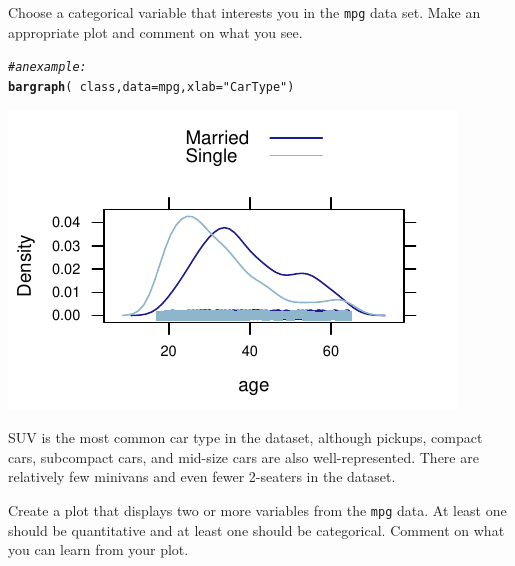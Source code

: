 \documentclass[twoside]{book}\usepackage[]{graphicx}\usepackage[]{xcolor}
\makeatletter
\def\maxwidth{ %
  \ifdim\Gin@nat@width>\linewidth
    \linewidth
  \else
    \Gin@nat@width
  \fi
}
\newcommand{\hlstr}[1]{\textcolor[rgb]{0.192,0.494,0.8}{#1}}%
\newcommand{\hlcom}[1]{\textcolor[rgb]{0.678,0.584,0.686}{\textit{#1}}}%
\newcommand{\hlopt}[1]{\textcolor[rgb]{0,0,0}{#1}}%
\newcommand{\hlstd}[1]{\textcolor[rgb]{0.345,0.345,0.345}{#1}}%
\newcommand{\hlkwc}[1]{\textcolor[rgb]{0.333,0.667,0.333}{#1}}%
\newcommand{\hlkwd}[1]{\textcolor[rgb]{0.737,0.353,0.396}{\textbf{#1}}}%
\newenvironment{kframe}{%
 \def\at@end@of@kframe{}%
 \ifinner\ifhmode%
  \def\at@end@of@kframe{\end{minipage}}%
  \begin{minipage}{\columnwidth}%
 \fi\fi%
 \def\FrameCommand##1{\hskip\@totalleftmargin \hskip-\fboxsep
 \colorbox{shadecolor}{##1}\hskip-\fboxsep
     \hskip-\linewidth \hskip-\@totalleftmargin \hskip\columnwidth}%
 \MakeFramed {\advance\hsize-\width
   \@totalleftmargin\z@ \linewidth\hsize
   \@setminipage}}%
 {\par\unskip\endMakeFramed%
 \at@end@of@kframe}
\newenvironment{knitrout}{}{} %
\newcommand{\Rindex}[1]{\index{\texttt{#1}}}
\newcommand{\dataframe}[1]{{\color{blue!80!black}\texttt{#1}}\Rindex{#1}}
\newcounter{example}[section]
\makeatother
\begin{document}
\begin{problem}
	Choose a categorical variable that interests you in the \dataframe{mpg}
	data set.  Make an appropriate plot and comment on what you see.
\end{problem}
\begin{solution}
\begin{knitrout}
\color{fgcolor}\begin{kframe}
\begin{alltt}
\hlcom{# an example:}
\hlkwd{bargraph}\hlstd{(}\hlopt{~}\hlstd{class,} \hlkwc{data} \hlstd{= mpg,} \hlkwc{xlab} \hlstd{=} \hlstr{"Car Type"}\hlstd{)}
\end{alltt}
\end{kframe}

{\centering \includegraphics[width=\maxwidth]{figures/fig-unnamed-chunk-24-1} 

}



\end{knitrout}
SUV is the most common car type in the dataset, although pickups, compact cars, subcompact cars, and mid-size cars are also well-represented.  There are relatively few minivans and even fewer 2-seaters in the dataset.
\end{solution}

\begin{problem}
	Create a plot that displays two or more variables from the 
	\dataframe{mpg} data.  At least one should be quantitative 
	and at least one should be categorical.
	Comment on what you can learn from your plot.
\end{problem}
\end{document}
